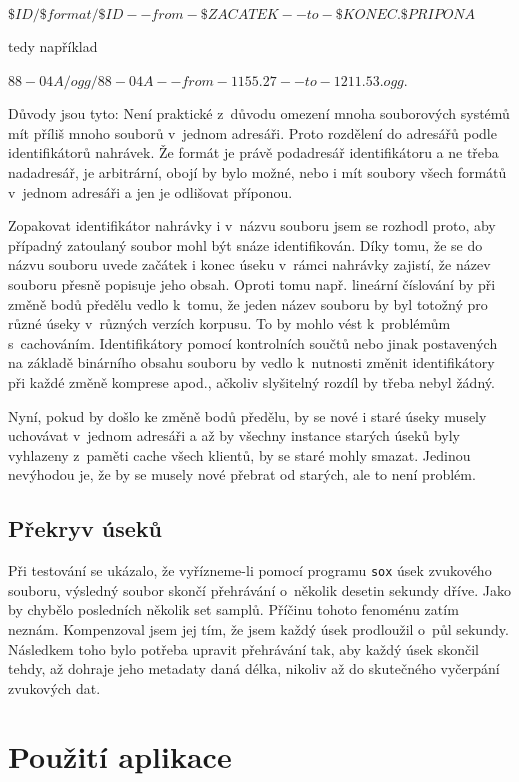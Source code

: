 $\$ID/\$format/\$ID--from-\$ZACATEK--to-\$KONEC.\$PRIPONA$

tedy například

$88-04A/ogg/88-04A--from-1155.27--to-1211.53.ogg$.

Důvody jsou tyto: Není praktické z~důvodu omezení mnoha souborových systémů mít
příliš mnoho souborů v~jednom adresáři. Proto rozdělení do adresářů podle
identifikátorů nahrávek. Že formát je právě podadresář identifikátoru a ne třeba
nadadresář, je arbitrární, obojí by bylo možné, nebo i mít soubory všech formátů
v~jednom adresáři a jen je odlišovat příponou.

Zopakovat identifikátor nahrávky i v~názvu souboru jsem se rozhodl proto, aby
případný zatoulaný soubor mohl být snáze identifikován. Díky tomu, že se do
názvu souboru uvede začátek i konec úseku v~rámci nahrávky zajistí, že název
souboru přesně popisuje jeho obsah. Oproti tomu např. lineární číslování by při
změně bodů předělu vedlo k~tomu, že jeden název souboru by byl totožný pro různé
úseky v~různých verzích korpusu. To by mohlo vést k~problémům s~cachováním.
Identifikátory pomocí kontrolních součtů nebo jinak postavených na základě
binárního obsahu souboru by vedlo k~nutnosti změnit identifikátory při každé
změně komprese apod., ačkoliv slyšitelný rozdíl by třeba nebyl žádný.

Nyní, pokud by došlo ke změně bodů předělu, by se nové i staré úseky musely
uchovávat v~jednom adresáři a až by všechny instance starých úseků byly
vyhlazeny z~paměti cache všech klientů, by se staré mohly smazat. Jedinou
nevýhodou je, že by se musely nové přebrat od starých, ale to není problém.

\subsection{Překryv úseků}

Při testování se ukázalo, že vyřízneme-li pomocí programu \texttt{sox} úsek
zvukového souboru, výsledný soubor skončí přehrávání o~několik desetin sekundy
dříve. Jako by chybělo posledních několik set samplů. Příčinu tohoto fenoménu
zatím neznám. Kompenzoval jsem jej tím, že jsem každý úsek prodloužil o~půl
sekundy. Následkem toho bylo potřeba upravit přehrávání tak, aby každý úsek
skončil tehdy, až dohraje jeho metadaty daná délka, nikoliv až do skutečného
vyčerpání zvukových dat.


\section{Použití aplikace}

